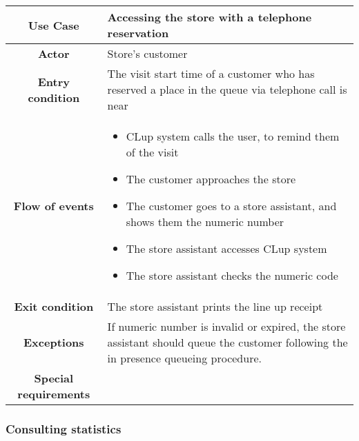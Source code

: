 \documentclass[../../main.tex]{subfiles}
\begin{document}
      \begin{table}[H]
        \centering
          \begin{tabular}{c m{}}
          \hline
          \textbf{Use Case} & Accessing the store with a telephone reservation\\ \hline
          \textbf{Actor} & Store's customer\\ \hline
          \textbf{Entry condition} & The visit start time of a customer who has reserved a place in the queue via telephone call is near\\  \hline
          \textbf{Flow of events} & \begin{itemize}
                                      \item CLup system calls the user, to remind them of the visit
                                      \item The customer approaches the store
                                      \item The customer goes to a store assistant, and shows them the numeric number
                                      \item The store assistant accesses CLup system
                                      \item The store assistant checks the numeric code
                                    \end{itemize}\\ \hline
          \textbf{Exit condition} & The store assistant prints the line up receipt \\ \hline
          \textbf{Exceptions} & If numeric number is invalid or expired, the store assistant should queue the customer following the in presence queueing procedure.\\ \hline
          \textbf{Special requirements} &\\ \hline
          \end{tabular}
      \end{table}


      \subsubsection{Consulting statistics} %
\end{document}
